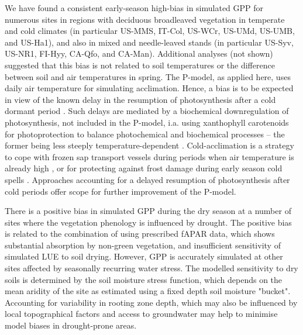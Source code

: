 \documentclass{myreport}
\begin{document}
We have found a consistent early-season high-bias in simulated GPP for numerous sites in regions with deciduous broadleaved vegetation in temperate and cold climates (in particular US-MMS, IT-Col, US-WCr, US-UMd, US-UMB, and US-Ha1), and also in mixed and needle-leaved stands (in particular US-Syv, US-NR1, FI-Hyy, CA-Qfo, and CA-Man). Additional analyses (not shown) suggested that this bias is not related to soil temperatures or the difference between soil and air temperatures in spring. The P-model, as applied here, uses daily air temperature for simulating acclimation. Hence, a bias is to be expected in view of the known delay in the resumption of photosynthesis after a cold dormant period \citep{huner93, oquist03, adams04, verhoeven14, bowling18}. Such delays are mediated by a biochemical downregulation of photosynthesis, not included in the P-model, i.a. using xanthophyll carotenoids for photoprotection \citep{adams04} to balance photochemical and biochemical processes -- the former being less steeply temperature-dependent \citep{oquist03}. Cold-acclimation is a strategy to cope with frozen sap transport vessels during periods when air temperature is already high \citep{bowling18}, or for protecting against frost damage during early season cold spells \citep{vitasse14}. Approaches accounting for a delayed resumption of photosynthesis after cold periods \citep{pelkonen80, bergh98, makela04} offer scope for further improvement of the P-model.

There is a positive bias in simulated GPP during the dry season at a number of sites where the vegetation phenology is influenced by drought. The positive bias is related to the combination of using prescribed fAPAR data, which shows substantial absorption by non-green vegetation, and insufficient sensitivity of simulated LUE to soil drying. However, GPP is accurately simulated at other sites affected by seasonally recurring water stress. The modelled sensitivity to dry soils is determined by the soil moisture stress function, which depends on the mean aridity of the site as estimated using a fixed depth soil moisture "bucket". Accounting for variability in rooting zone depth, which may also be influenced by local topographical factors and access to groundwater \citep{fan13sci, fan17pnas} may help to minimise model biases in drought-prone areas.
\end{document}
